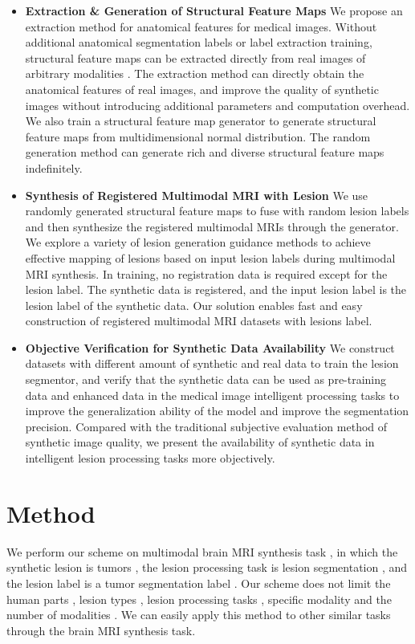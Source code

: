 \documentclass[letterpaper]{article} %
\begin{document}
\begin{itemize}
	\item \textbf{Extraction \& Generation of Structural Feature Maps}
	We propose an extraction method for anatomical features for medical images. Without additional anatomical segmentation labels or label extraction training, structural feature maps can be extracted directly from real images of arbitrary modalities . The extraction method can directly obtain the anatomical features of real images, and improve the quality of synthetic images without introducing additional parameters and computation overhead. We also train a structural feature map generator to generate structural feature maps from multidimensional normal distribution. The random generation method can generate rich and diverse structural feature maps indefinitely.
	\item \textbf{Synthesis of Registered Multimodal MRI with Lesion}
	We use randomly generated structural feature maps to fuse with random lesion labels and then synthesize the registered multimodal MRIs through the generator. We explore a variety of lesion generation guidance methods to achieve effective mapping of lesions based on input lesion labels during multimodal MRI synthesis. In training, no registration data is required except for the lesion label. The synthetic data is registered, and the input lesion label is the lesion label of the synthetic data. Our solution enables fast and easy construction of registered multimodal MRI datasets with lesions label.
	\item \textbf{Objective Verification for Synthetic Data Availability}
	We construct datasets with different amount of synthetic and real data to train the lesion segmentor, and verify that the synthetic data can be used as pre-training data and enhanced data in the medical image intelligent processing tasks to improve the generalization ability of the model and improve the segmentation precision. Compared with the traditional subjective evaluation method of synthetic image quality, we present the availability of synthetic data in intelligent lesion processing tasks more objectively.
\end{itemize}


\section{Method}
\label{method}
We perform our scheme on multimodal brain MRI synthesis task , in which the synthetic lesion is tumors , the lesion processing task is lesion segmentation , and the lesion label is a tumor segmentation label . Our scheme does not limit the human parts , lesion types , lesion processing tasks , specific modality and the number of modalities . We can easily apply this method to other similar tasks through the brain MRI synthesis task. 
\end{document}
